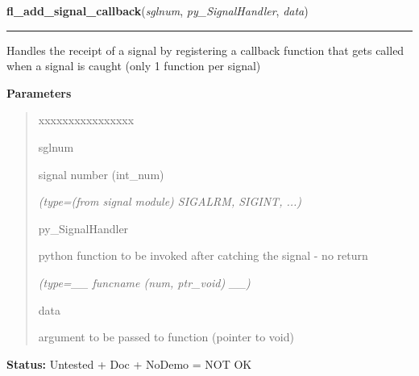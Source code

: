 \hspace{.8\funcindent}\begin{boxedminipage}{\funcwidth}

    \raggedright \textbf{fl\_add\_signal\_callback}(\textit{sglnum}, \textit{py\_SignalHandler}, \textit{data})

    \vspace{-1.5ex}

    \rule{\textwidth}{0.5\fboxrule}
\setlength{\parskip}{2ex}
    Handles the receipt of a signal by registering a callback function that
    gets called when a signal is caught (only 1 function per signal)

\setlength{\parskip}{1ex}
      \textbf{Parameters}
      \vspace{-1ex}

      \begin{quote}
        \begin{Ventry}{xxxxxxxxxxxxxxxx}

          \item[sglnum]

          signal number (int\_num)

            {\it (type=(from signal module) SIGALRM, SIGINT, ...)}

          \item[py\_SignalHandler]

          python function to be invoked after catching the signal - no 
          return

            {\it (type=\_\_ funcname (num, ptr\_void) \_\_)}

          \item[data]

          argument to be passed to function (pointer to void)

        \end{Ventry}

      \end{quote}

\textbf{Status:} Untested + Doc + NoDemo = NOT OK



    \end{boxedminipage}

    \label{xformslib:library:fl_remove_signal_callback}

    \vspace{0.5ex}

